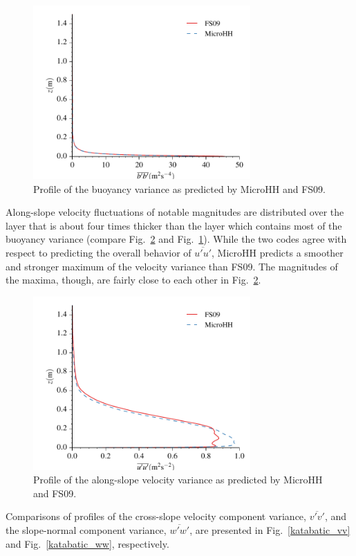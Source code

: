 \documentclass[gmd]{copernicus}
\begin{document}
\begin{figure}
\centerline{\includegraphics[width=8.3cm]{figs/katabatic_bb.pdf}}
\caption{Profile of the buoyancy variance as predicted by MicroHH and FS09.}
\label{katabatic_bb}
\end{figure}

Along-slope velocity fluctuations of notable magnitudes are distributed over the layer that is about four times thicker than the layer which contains most of the buoyancy variance (compare Fig.~\ref{katabatic_uu} and Fig.~\ref{katabatic_bb}). While the two codes agree with respect to predicting the overall behavior of $\overline{u'u'}$, MicroHH predicts a smoother and stronger maximum of the velocity variance than FS09. The magnitudes of the maxima, though, are fairly close to each other in Fig.~\ref{katabatic_uu}.

\begin{figure}
\centerline{\includegraphics[width=8.3cm]{figs/katabatic_uu.pdf}}
\caption{Profile of the along-slope velocity variance as predicted by MicroHH and FS09.}
\label{katabatic_uu}
\end{figure}

Comparisons of profiles of the cross-slope velocity component variance, $\overline{v'v'}$, and the slope-normal component variance, $\overline{w'w'}$, are presented in Fig.~\ref{katabatic_vv} and Fig.~\ref{katabatic_ww}, respectively.
\end{document}
